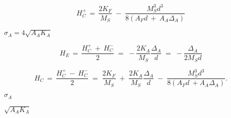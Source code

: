 {\newpage\clearpage
{}%
\begin{displaymath}H_C^+ \, = \, \frac{2K_F}{M_S} \; - \; \frac{M^3_S d^3}{8(A_Fd \: + \:
A_A \Delta_A)}
\end{displaymath}%
\lthtmldisplayZ
\hfill\lthtmlcheckvsize\clearpage}

{\newpage\clearpage
{}%
$\sigma_A = 4
\sqrt{A_A K_A}$%
\lthtmlinlinemathZ
\hfill\lthtmlcheckvsize\clearpage}

{\newpage\clearpage
{}%
\begin{displaymath}H_E \, = \, \frac{H_C^+ \: + \: H_C^-}{2} \; = \; - \frac{2K_A}{M_S}
\frac{\Delta_A}{d} \; = \; - \frac{\Delta_A}{2M_S d}
\end{displaymath}%
\lthtmldisplayZ
\hfill\lthtmlcheckvsize\clearpage}

{\newpage\clearpage
{}%
\begin{displaymath}H_C \, = \, \frac{H_C^+ \: - \: H_C^-}{2} \; = \; \frac{2K_F}{M_S} \;
+ \; \frac{2K_A}{M_S}\frac{\Delta_A}{d} \; - \; \frac{M_S^3
d^3}{8(A_Fd \: + A_A \Delta_A)} .
\end{displaymath}%
\lthtmldisplayZ
\hfill\lthtmlcheckvsize\clearpage}

{\newpage\clearpage
{}%
$\sigma_A$%
\lthtmlinlinemathZ
\hfill\lthtmlcheckvsize\clearpage}

{\newpage\clearpage
{}%
$\sqrt{A_A K_A}$%
\lthtmlinlinemathZ
\hfill\lthtmlcheckvsize\clearpage}

